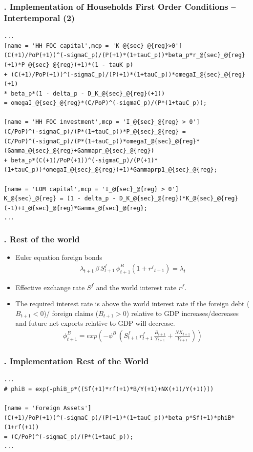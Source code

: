 \documentclass[11pt,aspectratio=169]{beamer}
\begin{document}
\begin{frame}[fragile]
\frametitle{{\thesection.\thesubsection} Implementation of Households First Order Conditions -- Intertemporal (2)}

\begin{lstlisting}[frame = single]
...
[name = 'HH FOC capital',mcp = 'K_@{sec}_@{reg}>0']
(C(+1)/PoP(+1))^(-sigmaC_p)/(P(+1)*(1+tauC_p))*beta_p*r_@{sec}_@{reg}(+1)*P_@{sec}_@{reg}(+1)*(1 - tauK_p)
+ (C(+1)/PoP(+1))^(-sigmaC_p)/(P(+1)*(1+tauC_p))*omegaI_@{sec}_@{reg}(+1) 
* beta_p*(1 - delta_p - D_K_@{sec}_@{reg}(+1))
= omegaI_@{sec}_@{reg}*(C/PoP)^(-sigmaC_p)/(P*(1+tauC_p));

[name = 'HH FOC investment',mcp = 'I_@{sec}_@{reg} > 0']       
(C/PoP)^(-sigmaC_p)/(P*(1+tauC_p))*P_@{sec}_@{reg} = 
(C/PoP)^(-sigmaC_p)/(P*(1+tauC_p))*omegaI_@{sec}_@{reg}*(Gamma_@{sec}_@{reg}+Gammapr_@{sec}_@{reg})
+ beta_p*(C(+1)/PoP(+1))^(-sigmaC_p)/(P(+1)*(1+tauC_p))*omegaI_@{sec}_@{reg}(+1)*Gammaprp1_@{sec}_@{reg};
				
[name = 'LOM capital',mcp = 'I_@{sec}_@{reg} > 0']
K_@{sec}_@{reg} = (1 - delta_p - D_K_@{sec}_@{reg})*K_@{sec}_@{reg}(-1)+I_@{sec}_@{reg}*Gamma_@{sec}_@{reg};
...
\end{lstlisting}
\end{frame}

\begin{frame}
\frametitle{{\thesection.\thesubsection} Rest of the world}
\scriptsize
\begin{itemize}
\item Euler equation foreign bonds
\begin{align*}
\lambda_{t+1} \, \beta \, S^{f}_{t+1} \, \phi^{B}_{t+1} \left(1+{{r^{f}}_{t+1}}\right) = \lambda_{t}
\end{align*}
\item Effective exchange rate $S^f$ and the world interest rate $r^f$.
\item The required interest rate is above the world interest rate if the foreign debt ($B_{t+1}<0$)/ foreign claims ($B_{t+1}>0$) relative to GDP increases/decreases and future net exports relative to GDP will decrease. 
\begin{align*}
\phi^{B}_{t+1} = exp \left(-\phi^B \,(S^{f}_{t+1} \, r^{f}_{t+1} \, \frac{B_{t+1}}{Y_{t+1}}+\frac{NX_{t+1}}{Y_{t+1}})\right)
\end{align*}
\end{itemize}
\end{frame}

\begin{frame}[fragile]
\frametitle{{\thesection.\thesubsection} Implementation Rest of the World}

\begin{lstlisting}[frame = single]
...
# phiB = exp(-phiB_p*((Sf(+1)*rf(+1)*B/Y(+1)+NX(+1)/Y(+1))))

[name = 'Foreign Assets']
(C(+1)/PoP(+1))^(-sigmaC_p)/(P(+1)*(1+tauC_p))*beta_p*Sf(+1)*phiB*(1+rf(+1))
= (C/PoP)^(-sigmaC_p)/(P*(1+tauC_p));
...
\end{lstlisting}
\end{frame}
\end{document}
